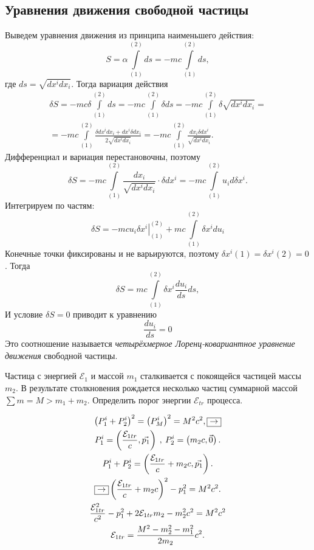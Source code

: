 \subsection{Уравнения движения свободной частицы}
    Выведем уравнения движения из принципа наименьшего действия:
    \[
        S = \alpha \int\limits_{(1)}^{(2)} ds = -mc\int\limits_{(1)}^{(2)} ds,
    \]
    где $ds = \sqrt{dx^idx_i}$. Тогда вариация действия
    \[
        \begin{split}
            \delta S = -mc\delta\int\limits_{(1)}^{(2)}ds = -mc\int\limits_{(1)}^{(2)}\delta ds = -mc\int\limits_{(1)}^{(2)}\delta\sqrt{dx^idx_i} = \\
        = -mc\int\limits_{(1)}^{(2)}\frac{\delta dx^idx_i + dx^i\delta dx_i}{2\sqrt{dx^idx_i}}
        = -mc\int\limits_{(1)}^{(2)}\frac{dx_i\delta dx^i}{\sqrt{dx^idx_i}}.
        \end{split}
    \]
    Дифференциал и вариация перестановочны, поэтому
    \[
        \delta S = -mc\int\limits_{(1)}^{(2)}\frac{dx_i}{\sqrt{dx^idx_i}}\cdot\delta dx^i
        = -mc\int\limits_{(1)}^{(2)}u_id\delta x^i.
    \]
    Интегрируем по частям:
    \[
        \delta S = \left. -mcu_i\delta x^i \right| _{(1)}^{(2)} + mc\int\limits_{(1)}^{(2)}\delta x^idu_i
    \]
    Конечные точки фиксированы и не варьируются, поэтому $\delta x^i(1) = \delta x^i(2) = 0$. Тогда
    \[
        \delta S = mc \int\limits_{(1)}^{(2)}\delta x^i \frac{du_i}{ds}ds,
    \]
    И условие $\delta S = 0$ приводит к уравнению
    \[
        \boxed{\frac{du_i}{ds} = 0}
    \]
    Это соотношение называется \textit{четырёхмерное Лоренц-ковариантное уравнение движения} свободной частицы.
    \begin{example}
        Частица с энергией $\mathcal{E}_1$ и массой $m_1$ сталкивается с покоящейся частицей массы $m_2$. В результате столкновения
        рождается несколько частиц суммарной массой $\sum m = M > m_1 + m_2$. Определить порог энергии $\mathcal{E}_{tr}$ процесса.
        \begin{figure}[h]
            \centering
            
        \end{figure}
    \end{example}
    \begin{nonum}
        \begin{gather*}
            \left({P^i_1 + P^i_2}\right)^2 = \left({P^i_M}\right)^2 = M^2c^2, \boxed{\rightarrow} \\
            P^i_1 = \left({\frac{\mathcal{E}_{1tr}}{c}, \vec{p_1}}\right)\:,\: P^i_2 = \left({m_2c, \vec{0}}\right). \\
            P^i_1 + P^i_2 = \left({\frac{\mathcal{E}_{1tr}}{c} + m_2c, \vec{p_1}}\right). \\
            \boxed{\rightarrow} \left({\frac{\mathcal{E}_{1tr}}{c} + m_2c}\right)^2 - p_1^2 = M^2c^2. \\
            \frac{\mathcal{E}_{1tr}^2}{c^2} - p_1^2 + 2 \mathcal{E}_{1tr} m_2 - m_2^2c^2 = M^2c^2 \\
            \mathcal{E}_{1tr} = \frac{M^2 - m_2^2 - m_1^2}{2m_2}c^2.
        \end{gather*}
        
    \end{nonum}

